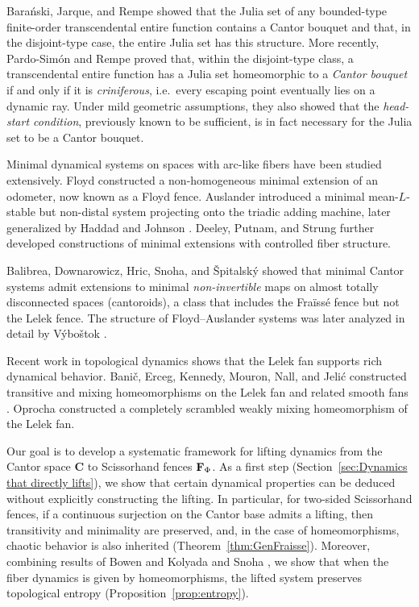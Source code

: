 \documentclass[11pt]{amsart}
\newcommand{\cantor}{\mathbf C}
\newcommand{\fence}{{\bf F}_{\Phi}{}}
\begin{document}
Barański, Jarque, and Rempe \cite{BaranskiJarqueRempe2012} showed that the Julia set of any bounded-type finite-order transcendental entire function contains a Cantor bouquet and that, in the disjoint-type case, the entire Julia set has this structure. More recently, Pardo-Sim\'on and Rempe \cite{MashaelRempeSixsmith2022} proved that, within the disjoint-type class, a transcendental entire function has a Julia set homeomorphic to a \emph{Cantor bouquet} if and only if it is \emph{criniferous}, i.e.\ every escaping point eventually lies on a dynamic ray. Under mild geometric assumptions, they also showed that the \emph{head-start condition}, previously known to be sufficient, is in fact necessary for the Julia set to be a Cantor bouquet.

Minimal dynamical systems on spaces with arc-like fibers have been studied extensively. Floyd \cite{Floyd} constructed a non-homogeneous minimal extension of an odometer, now known as a Floyd fence. Auslander \cite{Auslander1959} introduced a minimal mean-$L$-stable but non-distal system projecting onto the triadic adding machine, later generalized by Haddad and Johnson \cite{HaddadJohnson97}. Deeley, Putnam, and Strung \cite{DeeleyPutnamStrung} further developed constructions of minimal extensions with controlled fiber structure. 

Balibrea, Downarowicz, Hric, Snoha, and \v{S}pitalsk\'y \cite{BalibreaDownarowiczHricSnohaSpitalsky} showed that minimal Cantor systems admit extensions to minimal \emph{non-invertible} maps on almost totally disconnected spaces (cantoroids), a class that includes the Fra\"iss\'e fence but not the Lelek fence. The structure of Floyd--Auslander systems was later analyzed in detail by V\'ybo\v{s}tok \cite{Vybostok}.

Recent work in topological dynamics shows that the Lelek fan supports rich dynamical behavior. Banič, Erceg, Kennedy, Mouron, Nall, and Jelić constructed transitive and mixing homeomorphisms on the Lelek fan and related smooth fans \cite{banic2023transitive,banic2024chaos,banic2025fraisse}. Oprocha \cite{Oprocha2024} constructed a completely scrambled weakly mixing homeomorphism of the Lelek fan.

Our goal is to develop a systematic framework for lifting dynamics from the Cantor space $\cantor$ to Scissorhand fences $\fence$. As a first step (Section~\ref{sec:Dynamics that directly lifts}), we show that certain dynamical properties can be deduced without explicitly constructing the lifting. In particular, for two-sided Scissorhand fences, if a continuous surjection on the Cantor base admits a lifting, then transitivity and minimality are preserved, and, in the case of homeomorphisms, chaotic behavior is also inherited (Theorem~\ref{thm:GenFraisse}). Moreover, combining results of Bowen \cite{Bowen} and Kolyada and Snoha \cite{KolyadaSnoha}, we show that when the fiber dynamics is given by homeomorphisms, the lifted system preserves topological entropy (Proposition~\ref{prop:entropy}).
\end{document}
